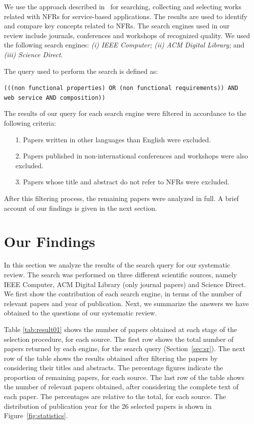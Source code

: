 \documentclass{sig-alternate}
\begin{document}
We use the approach described in~\cite{Kitchenham08} for searching,
collecting and selecting works related with NFRs for service-based applications. 
The results are used to identify and compare key concepts related to NFRs.
The search engines used in our review include journals, conferences and
workshops of recognized quality. 
We used the following search engines: \textit{(i) IEEE Computer; (ii) ACM Digital Library;} and
\textit{(iii) Science Direct}.

The query used to perform the search is defined as: 
 \begin{center}
\texttt{(((non functional properties) OR (non functional requirements))
AND web service AND composition))}
\end{center}

The results of our query for each search engine were filtered in accordance to the following criteria:
\begin{enumerate}
\item[1.] Papers written in other languages than English were excluded.
\item[2.] Papers published in non-international conferences and workshops were also excluded.
\item[3.] Papers whose title and abstract do not refer to NFRs were excluded. 
\end{enumerate}

After this filtering process, the remaining papers were analyzed in full.
A brief account of our findings is given in the next section.

\section{Our Findings}   
\label{sec:nfindings}   




In this section we analyze the results of the search query for our systematic review.
The search was performed on three different scientific sources, namely IEEE Computer, ACM Digital Library (only journal papers) and Science Direct.
We first show the contribution of each search engine, in terms of the number of relevant papers and year of publication.
Next, we summarize the answers we have obtained to the questions of our systematic review.

Table \ref{tab:result01} shows the number of papers obtained at each stage
of the selection procedure, for each source. 
The first row shows the total number of papers returned by each engine, for the search query (Section~\ref{sec:sr}).
The next row of the table shows the results obtained after filtering the papers by considering their titles and abstracts.
The percentage figures indicate the proportion of remaining papers, for each source.
The last row of the table shows the number of relevant papers obtained, after considering the complete text of each paper.
The percentages are relative to the total, for each source.
The distribution of publication year for the 26 selected papers is shown in Figure~\ref{fig:statistics}.
\end{document}
